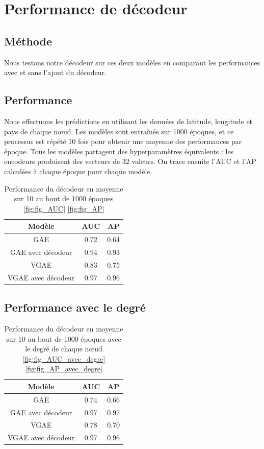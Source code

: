 \documentclass{article}
\begin{document}
\section{Performance de décodeur}
\subsection{Méthode}
Nous testons notre décodeur sur ces deux modèles en comparant les performances avec et sans l'ajout du décodeur. \newline

\subsection{Performance}

Nous effectuons les prédictions en utilisant les données de latitude, longitude et pays de chaque nœud. Les modèles sont entraînés sur 1000 époques, et ce processus est répété 10 fois pour obtenir une moyenne des performances par époque. Tous les modèles partagent des hyperparamètres équivalents : les encodeurs produisent des vecteurs de 32 valeurs. On trace ensuite l'AUC et l'AP calculées à chaque époque pour chaque modèle.

\begin{table}[H]
    \centering
    \begin{tabular}{|c|c|c|}
        \hline
        Modèle & AUC & AP\\
        \hline
        GAE & 0.72 & 0.64\\
        \hline
        GAE avec décodeur & 0.94 & 0.93\\
        \hline
        VGAE & 0.83 & 0.75\\
        \hline
        VGAE avec décodeur & 0.97 & 0.96\\
        \hline
    \end{tabular}
    \caption{Performance du décodeur en moyenne sur 10 au bout de 1000 époques \ref{fig:fig_AUC} \ref{fig:fig_AP}}
    \label{tab:performance_decodeur}
\end{table}

\subsection{Performance avec le degré}

\begin{table}[H]
    \centering
    \begin{tabular}{|c|c|c|}
        \hline
        Modèle & AUC & AP\\
        \hline
        GAE & 0.74 & 0.66\\
        \hline
        GAE avec décodeur & 0.97 & 0.97\\
        \hline
        VGAE & 0.78 & 0.70\\
        \hline
        VGAE avec décodeur & 0.97 & 0.96\\
        \hline
    \end{tabular}
    \caption{Performance du décodeur en moyenne sur 10 au bout de 1000 époques avec le degré de chaque nœud \ref{fig:fig_AUC_avec_degre} \ref{fig:fig_AP_avec_degre}}
    \label{tab:performance_decodeur_avec_degre}
\end{table}
\end{document}
